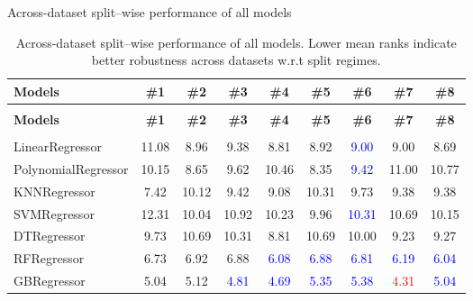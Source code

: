 \begin{frame}{Across-dataset split–wise performance of all models}
    \tiny
    \begin{longtable}{lcccccccc}
    \caption{Across-dataset split–wise performance of all models. Lower mean ranks indicate better robustness across datasets w.r.t split regimes.}
    \label{tab:split_wise_rank} \\
    \toprule
    \textbf{Models} &
    \textbf{\#1} &
    \textbf{\#2} &
    \textbf{\#3} &
    \textbf{\#4} &
    \textbf{\#5} &
    \textbf{\#6} &
    \textbf{\#7} &
    \textbf{\#8} \\
    \midrule
    \endfirsthead

    \multicolumn{9}{c}{} \\
    \toprule
    \textbf{Models} &
    \textbf{\#1} &
    \textbf{\#2} &
    \textbf{\#3} &
    \textbf{\#4} &
    \textbf{\#5} &
    \textbf{\#6} &
    \textbf{\#7} &
    \textbf{\#8} \\
    \midrule
    \endhead

    \midrule
    \multicolumn{9}{r}{} \\
    \endfoot

    \bottomrule
    \endlastfoot

    LinearRegressor & 11.08 & 8.96 & 9.38 & 8.81 & 8.92 & \textcolor{blue}{9.00} & 9.00 & 8.69 \\

    PolynomialRegressor & 10.15 & 8.65 & 9.62 & 10.46 & 8.35 & \textcolor{blue}{9.42} & 11.00 & 10.77 \\

    KNNRegressor & 7.42 & 10.12 & 9.42 & 9.08 & 10.31 & 9.73 & 9.38 & 9.38 \\

    SVMRegressor & 12.31 & 10.04 & 10.92 & 10.23 & 9.96 & \textcolor{blue}{10.31} & 10.69 & 10.15 \\

    DTRegressor & 9.73 & 10.69 & 10.31 & 8.81 & 10.69 & 10.00 & 9.23 & 9.27 \\

    RFRegressor & 6.73 & 6.92 & 6.88 & \textcolor{blue}{6.08} & \textcolor{blue}{6.88} & \textcolor{blue}{6.81} & \textcolor{blue}{6.19} & \textcolor{blue}{6.04} \\

    GBRegressor & 5.04 & 5.12 & \textcolor{blue}{4.81} & \textcolor{blue}{4.69} & \textcolor{blue}{5.35} & \textcolor{blue}{5.38} & \textcolor{red}{4.31} & \textcolor{blue}{5.04} \\


\end{longtable}
\end{frame}
